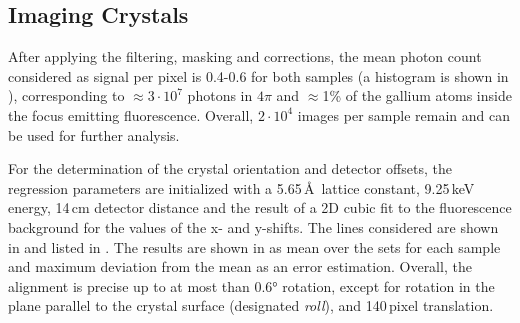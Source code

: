 \subsection{Imaging Crystals}

After applying the filtering, masking and corrections, the mean photon count considered as signal per pixel is 0.4-0.6 for both samples (a histogram is shown in ), corresponding to $\approx 3\cdot10^7$ photons in $4\pi$ and $\approx$1\% of the gallium atoms inside the focus emitting fluorescence. Overall, $2\cdot10^4$ images per sample remain and can be used for further analysis.

For the determination of the crystal orientation and detector offsets, the regression parameters are initialized with a 5.65\,\AA\, lattice constant, 9.25\,keV energy, 14\,cm detector distance and the result of a 2D cubic fit to the fluorescence background for the values of the x- and y-shifts. The  lines considered are shown in  and listed in . The results are shown in  as mean over the sets for each sample and maximum deviation from the mean as an error estimation. Overall, the alignment is precise up to at most than 0.6° rotation, except for rotation in the plane parallel to the crystal surface (designated \textit{roll}), and 140\,pixel translation.

